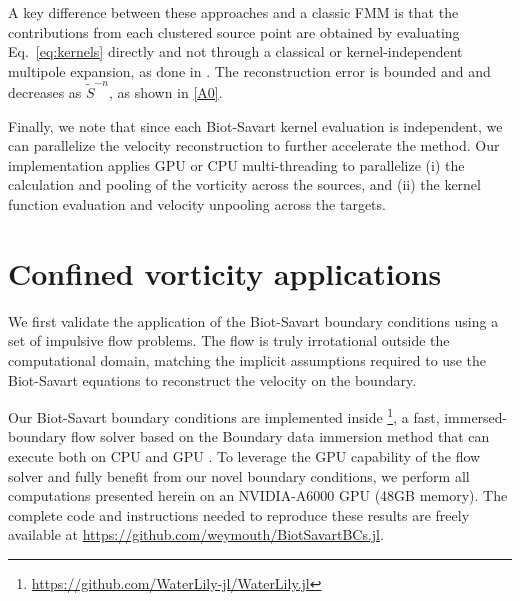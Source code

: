 \documentclass[final,1p,times]{elsarticle}
\begin{document}
A key difference between these approaches and a classic FMM is that the contributions from each clustered source point are obtained by evaluating Eq.~\ref{eq:kernels} directly and not through a classical or kernel-independent multipole expansion, as done in \cite{Ying2004ADimensions, Liska2014AEquations}. The reconstruction error is bounded and and decreases as $\tilde S^{-n}$, as shown in \ref{A0}. %


Finally, we note that since each Biot-Savart kernel evaluation is independent, we can parallelize the velocity reconstruction to further accelerate the method. Our implementation applies GPU or CPU multi-threading to parallelize (i) the calculation and pooling of the vorticity across the sources, and (ii) the kernel function evaluation and velocity unpooling across the targets.

\section{Confined vorticity applications}

We first validate the application of the Biot-Savart boundary conditions using a set of impulsive flow problems. The flow is truly irrotational outside the computational domain, matching the implicit assumptions required to use the Biot-Savart equations to reconstruct the velocity on the boundary. 

Our Biot-Savart boundary conditions are implemented inside \textbf{}\footnote{\url{https://github.com/WaterLily-jl/WaterLily.jl}}, a fast, immersed-boundary flow solver based on the Boundary data immersion method \cite{Maertens2015} that can execute both on CPU and GPU \cite{Weymouth2023WaterLily.jl:Execution}. To leverage the GPU capability of the flow solver and fully benefit from our novel boundary conditions, we perform all computations presented herein on an NVIDIA-A6000 GPU (48GB memory). The complete code and instructions needed to reproduce these results are freely available at \url{https://github.com/weymouth/BiotSavartBCs.jl}.
\end{document}

